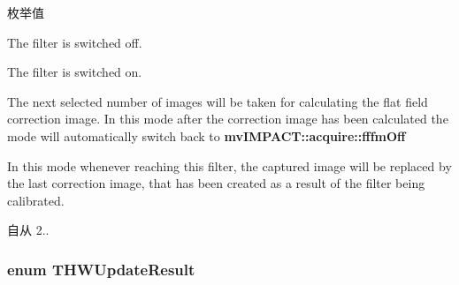 \begin{Desc}
\item[枚举值]\par
\begin{description}
\item[{\em 
\hypertarget{group___common_interface_gga40b7d79a1a58736a449305e4447060f8a6cd24229bba67b6b6518b5b6da451206}{fffm\+Off}\label{group___common_interface_gga40b7d79a1a58736a449305e4447060f8a6cd24229bba67b6b6518b5b6da451206}
}]The filter is switched off. \item[{\em 
\hypertarget{group___common_interface_gga40b7d79a1a58736a449305e4447060f8a01a4bd5ff4b54e482b053715c2cb633d}{fffm\+On}\label{group___common_interface_gga40b7d79a1a58736a449305e4447060f8a01a4bd5ff4b54e482b053715c2cb633d}
}]The filter is switched on. \item[{\em 
\hypertarget{group___common_interface_gga40b7d79a1a58736a449305e4447060f8aaee28d9b28016322381bd5a85d69d00f}{fffm\+Calibrate\+Flat\+Field}\label{group___common_interface_gga40b7d79a1a58736a449305e4447060f8aaee28d9b28016322381bd5a85d69d00f}
}]The next selected number of images will be taken for calculating the flat field correction image. In this mode after the correction image has been calculated the mode will automatically switch back to {\bfseries mv\+I\+M\+P\+A\+C\+T\+::acquire\+::fffm\+Off} \item[{\em 
\hypertarget{group___common_interface_gga40b7d79a1a58736a449305e4447060f8ae0bc976bf1bee50b2c15129367a17af3}{fffm\+Transmit\+Correction\+Image}\label{group___common_interface_gga40b7d79a1a58736a449305e4447060f8ae0bc976bf1bee50b2c15129367a17af3}
}]In this mode whenever reaching this filter, the captured image will be replaced by the last correction image, that has been created as a result of the filter being calibrated. \begin{DoxySince}{自从}
2.. 
\end{DoxySince}
\end{description}
\end{Desc}
\hypertarget{group___common_interface_ga11e4aee028c717dbe4bd4a9e7d97832e}{
\subsubsection[{T\+H\+W\+Update\+Result}]{\setlength{\rightskip}{0pt plus 5cm}enum {\bf T\+H\+W\+Update\+Result}}}\label{group___common_interface_ga11e4aee028c717dbe4bd4a9e7d97832e}


